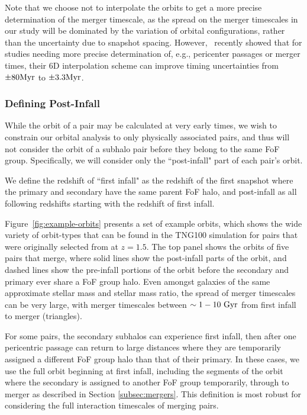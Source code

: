 \documentclass[twocolumn,linenumbers]{aastex631}
\newcommand{\chambe}{\citet{Chamberlain2024}}
\begin{document}
Note that we choose not to interpolate the orbits to get a more precise determination of the merger timescale, as the spread on the merger timescales in our study will be dominated by the variation of orbital configurations, rather than the uncertainty due to snapshot spacing. However,~\citet{Patton2024} recently showed that for studies needing more precise determination of, e.g., pericenter passages or merger times, their 6D interpolation scheme can improve timing uncertainties from $\pm80\mathrm{Myr}$ to $\pm3.3\mathrm{Myr}$.

\subsubsection{Defining Post-Infall}
While the orbit of a pair may be calculated at very early times, we wish to constrain our orbital analysis to only physically associated pairs, and thus will not consider the orbit of a subhalo pair before they belong to the same FoF group. 
Specifically, we will consider only the ``post-infall" part of each pair's orbit. 

We define the redshift of ``first infall" as the redshift of the first snapshot where the primary and secondary have the same parent FoF halo, and post-infall as all following redshifts starting with the redshift of first infall. 

Figure~\ref{fig:example-orbits} presents a set of example orbits, which shows the wide variety of orbit-types that can be found in the TNG100 simulation for pairs that were originally selected from \chambe{} at $z=1.5$. 
The top panel shows the orbits of five pairs that merge, where solid lines show the post-infall parts of the orbit, and dashed lines show the pre-infall portions of the orbit before the secondary and primary ever share a FoF group halo. 
Even amongst galaxies of the same approximate stellar mass and stellar mass ratio, the spread of merger timescales can be very large, with merger timescales between $\sim1-10\,\mathrm{\,Gyr}$ from first infall to merger (triangles). 

For some pairs, the secondary subhalos can experience first infall, then after one pericentric passage can return to large distances where they are temporarily assigned a different FoF group halo than that of their primary. 
In these cases, we use the full orbit beginning at first infall, including the segments of the orbit where the secondary is assigned to another FoF group temporarily,  through to merger as described in Section \ref{subsec:mergers}.
This definition is most robust for considering the full interaction timescales of merging pairs.
\end{document}
